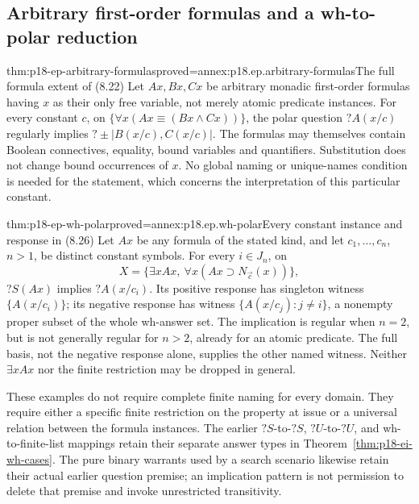 \subsection{Arbitrary first-order formulas and a wh-to-polar reduction}

\begin{hbtheorem}{thm:p18-ep-arbitrary-formulas}{proved=annex:p18.ep.arbitrary-formulas}{The full formula extent of (8.22)}
Let \(Ax,Bx,Cx\) be arbitrary monadic first-order formulas having
\(x\) as their only free variable, not merely atomic predicate instances.
For every constant \(c\), on
\(\{\forall x(Ax\equiv(Bx\land Cx))\}\), the polar question
\(?A(x/c)\) regularly implies
\(?\pm|B(x/c),C(x/c)|\).
The formulas may themselves contain Boolean connectives, equality,
bound variables and quantifiers. Substitution does not change bound
occurrences of \(x\). No global naming or unique-names condition is
needed for the statement, which concerns the interpretation of this
particular constant.
\end{hbtheorem}

\begin{hbtheorem}{thm:p18-ep-wh-polar}{proved=annex:p18.ep.wh-polar}{Every constant instance and response in (8.26)}
Let \(Ax\) be any formula of the stated kind, and let
\(c_1,\ldots,c_n\), \(n>1\), be distinct constant symbols.
For every \(i\in J_n\), on
\[
 X=\{\exists xAx,\ \forall x(Ax\supset N_{\vec c}(x))\},
\]
\(?S(Ax)\) implies \(?A(x/c_i)\). Its positive response has
singleton witness \(\{A(x/c_i)\}\); its negative response has witness
\(\{A(x/c_j):j\ne i\}\), a nonempty proper subset of the whole
wh-answer set. The implication is regular when \(n=2\), but is not
generally regular for \(n>2\), already for an atomic predicate.
The full basis, not the negative response alone, supplies the other
named witness. Neither \(\exists xAx\) nor the finite restriction may
be dropped in general.
\end{hbtheorem}

These examples do not require complete finite naming for every domain.
They require either a specific finite restriction on the property at issue
or a universal relation between the formula instances. The earlier
\(?S\)-to-\(?S\), \(?U\)-to-\(?U\), and wh-to-finite-list mappings
retain their separate answer types in
Theorem~\ref{thm:p18-ei-wh-cases}. The pure binary warrants used by a
search scenario likewise retain their actual earlier question premise;
an implication pattern is not permission to delete that premise and invoke
unrestricted transitivity.
